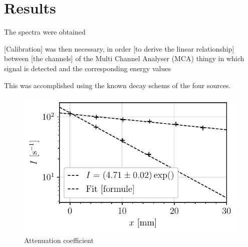 \section{Results}
The spectra were obtained

[Calibration] was then necessary,
in order [to derive the linear relationship] between [the channels] of the Multi Channel Analyser (MCA) thingy in which signal is detected 
and the corresponding energy values

This was accomplished using the known decay schems of the four sources.

\begin{figure}[h]
    \centering
    \includegraphics[scale=1]{figures/attenuation_coefficient.pdf}
    \caption{Attenuation coefficient}
    \label{fig:attenuation_coefficient}
\end{figure}